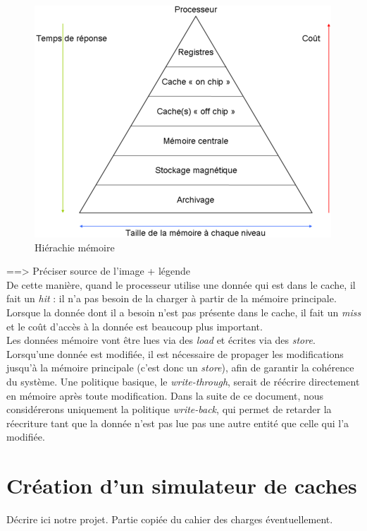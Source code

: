 \begin{figure}[!h]
\begin{center}
   \includegraphics[scale=0.75]{hierarchy.png}
   \caption{\label{img:hierarchy} Hiérachie mémoire}
\end{center}
\end{figure}

==> Préciser source de l'image + légende\\

De cette manière, quand le processeur utilise une donnée qui est dans le cache, il fait un \textit{hit} : il n'a pas besoin de la charger à partir de la mémoire principale. Lorsque la donnée dont il a besoin n'est pas présente dans le cache, il fait un \textit{miss} et le coût d'accès à la donnée est beaucoup plus important. \\

Les données mémoire vont être lues via des \textit{load} et écrites via des \textit{store}. Lorsqu'une donnée est modifiée, il est nécessaire de propager les modifications jusqu'à la mémoire principale (c'est donc un \textit{store}), afin de garantir la cohérence du système. Une politique basique, le \textit{write-through}, serait de réécrire directement en mémoire après toute modification. Dans la suite de ce document, nous considérerons uniquement la politique \textit{write-back}, qui permet de retarder la réecriture tant que la donnée n'est pas lue pas une autre entité que celle qui l'a modifiée.

\section{Création d'un simulateur de caches}

Décrire ici notre projet. Partie copiée du cahier des charges éventuellement.


